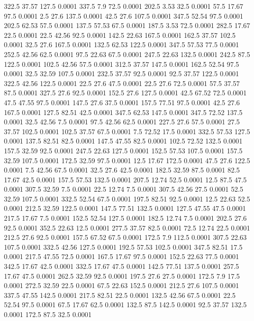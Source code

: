 322.5	37.57	127.5	0.0001
337.5	7.9	72.5	0.0001
202.5	3.53	32.5	0.0001
57.5	17.67	97.5	0.0001
2.5	27.6	137.5	0.0001
42.5	27.6	107.5	0.0001
347.5	52.54	97.5	0.0001
202.5	62.53	57.5	0.0001
137.5	57.53	67.5	0.0001
187.5	3.53	72.5	0.0001
282.5	17.67	22.5	0.0001
22.5	42.56	92.5	0.0001
142.5	22.63	167.5	0.0001
162.5	37.57	102.5	0.0001
32.5	27.6	167.5	0.0001
132.5	62.53	122.5	0.0001
347.5	57.53	77.5	0.0001
252.5	42.56	62.5	0.0001
97.5	22.63	67.5	0.0001
247.5	22.63	132.5	0.0001
242.5	87.5	122.5	0.0001
102.5	42.56	57.5	0.0001
312.5	37.57	147.5	0.0001
162.5	52.54	97.5	0.0001
32.5	32.59	107.5	0.0001
232.5	37.57	92.5	0.0001
92.5	37.57	122.5	0.0001
322.5	42.56	122.5	0.0001
22.5	27.6	47.5	0.0001
22.5	27.6	72.5	0.0001
57.5	37.57	87.5	0.0001
327.5	27.6	92.5	0.0001
152.5	27.6	127.5	0.0001
42.5	67.52	72.5	0.0001
47.5	47.55	97.5	0.0001
147.5	27.6	37.5	0.0001
157.5	77.51	97.5	0.0001
42.5	27.6	167.5	0.0001
127.5	82.51	42.5	0.0001
347.5	62.53	147.5	0.0001
347.5	72.52	137.5	0.0001
32.5	42.56	7.5	0.0001
97.5	42.56	62.5	0.0001
227.5	27.6	57.5	0.0001
27.5	37.57	102.5	0.0001
102.5	37.57	67.5	0.0001
7.5	72.52	17.5	0.0001
332.5	57.53	127.5	0.0001
137.5	82.51	82.5	0.0001
147.5	47.55	82.5	0.0001
102.5	72.52	132.5	0.0001
157.5	32.59	92.5	0.0001
247.5	22.63	127.5	0.0001
152.5	57.53	107.5	0.0001
157.5	32.59	107.5	0.0001
172.5	32.59	97.5	0.0001
12.5	17.67	172.5	0.0001
47.5	27.6	122.5	0.0001
7.5	42.56	67.5	0.0001
32.5	27.6	42.5	0.0001
182.5	32.59	87.5	0.0001
82.5	17.67	42.5	0.0001
157.5	57.53	132.5	0.0001
207.5	12.74	52.5	0.0001
12.5	87.5	47.5	0.0001
307.5	32.59	7.5	0.0001
22.5	12.74	7.5	0.0001
307.5	42.56	27.5	0.0001
52.5	32.59	107.5	0.0001
332.5	52.54	67.5	0.0001
197.5	82.51	92.5	0.0001
12.5	22.63	52.5	0.0001
212.5	32.59	122.5	0.0001
147.5	77.51	132.5	0.0001
127.5	47.55	47.5	0.0001
217.5	17.67	7.5	0.0001
152.5	52.54	127.5	0.0001
182.5	12.74	7.5	0.0001
202.5	27.6	92.5	0.0001
352.5	22.63	12.5	0.0001
277.5	37.57	82.5	0.0001
72.5	12.74	22.5	0.0001
212.5	27.6	92.5	0.0001
157.5	67.52	67.5	0.0001
172.5	7.9	112.5	0.0001
307.5	22.63	107.5	0.0001
332.5	42.56	127.5	0.0001
192.5	57.53	102.5	0.0001
347.5	82.51	17.5	0.0001
217.5	47.55	72.5	0.0001
167.5	17.67	97.5	0.0001
152.5	22.63	77.5	0.0001
342.5	17.67	42.5	0.0001
332.5	17.67	47.5	0.0001
142.5	77.51	137.5	0.0001
257.5	17.67	47.5	0.0001
262.5	32.59	92.5	0.0001
197.5	27.6	27.5	0.0001
172.5	7.9	17.5	0.0001
272.5	32.59	22.5	0.0001
67.5	22.63	152.5	0.0001
212.5	27.6	107.5	0.0001
337.5	47.55	142.5	0.0001
217.5	82.51	22.5	0.0001
132.5	42.56	67.5	0.0001
22.5	52.54	97.5	0.0001
67.5	17.67	62.5	0.0001
132.5	87.5	142.5	0.0001
92.5	37.57	132.5	0.0001
172.5	87.5	32.5	0.0001
